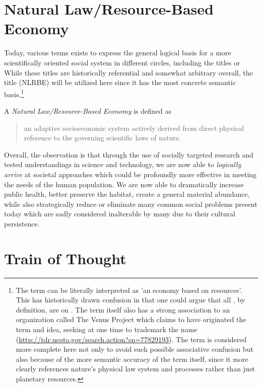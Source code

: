 \documentclass[10pt, a4paper, cleardoubleempty, openright, twoside]{book}
\begin{document}
\section {Natural Law/Resource-Based Economy}

Today, various terms exists to express the general logical basis for a
more scientifically oriented social system in different circles,
including the titles  or
 While these titles are historically
referential and somewhat arbitrary overall, the title  (NLRBE) will be utilized here since it has
the most concrete semantic basis.\footnote{ 
	The term  can be literally
	interpreted as 'an economy based on resources'. This has historically
	drawn confusion in that one could argue that all
	, by definition, are  on
	. The term itself also has a strong association
	to an organization called The Venus Project which claims to have
	originated the term and idea, seeking at one time to trademark the
	name (\url{http://tdr.uspto.gov/search.action?sn=77829193}). The term
	 is considered more
	complete here not only to avoid such possible associative confusion
	but also because of the more semantic accuracy of the term itself,
	since it more clearly references nature's physical law system and
	processes rather than just planetary resources.
}

A \emph{Natural Law/Resource-Based Economy} is defined as \blockquote{an
adaptive socioeconomic system actively derived from direct physical
reference to the governing scientific laws of nature.}

Overall, the observation is that through the use of socially targeted
research and tested understandings in science and technology, we are now
able to \emph{logically arrive} at societal approaches which could be
profoundly more effective in meeting the needs of the human population.
We are now able to dramatically increase public health, better preserve
the habitat, create a general material abundance, while also
strategically reduce or eliminate many common social problems present
today which are sadly considered inalterable by many due to their
cultural persistence.

\section {Train of Thought}
\end{document}
